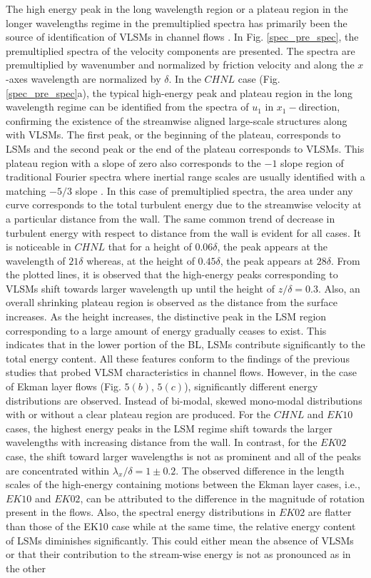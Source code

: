 The high energy peak in the  long wavelength region or a plateau region in the longer wavelengths regime in the premultiplied spectra has primarily been the source of identification of VLSMs in channel flows \cite{guala_adrian_jfm2006, fang2015blm}. In Fig. \ref{spec_pre_spec}, the premultiplied spectra of the velocity components are presented. The spectra are premultiplied by wavenumber and normalized by friction velocity and along the $x$-axes wavelength are normalized by $\delta$.  In the $CHNL$ case (Fig. \ref{spec_pre_spec}a), the typical high-energy peak and plateau region in the long wavelength regime can be identified from the spectra of $u_1$ in $x_1-$direction, confirming the existence of the streamwise aligned large-scale structures along with VLSMs. The first peak, or the beginning of the plateau, corresponds to LSMs and the second peak or the end of the plateau corresponds to VLSMs. This plateau region with a slope of zero also corresponds to the $-1$ slope region of traditional Fourier spectra where inertial range scales are usually identified with a matching $-5/3$ slope \cite{perry_chng_jfm_86,saddoughi1994}. In this case of premultiplied spectra, the area under any curve corresponds to the total turbulent energy due to the streamwise velocity at a particular distance from the wall. The same common trend of decrease in turbulent energy with respect to distance from the wall is evident for all cases. It is noticeable in $CHNL$  that for a height of $0.06\delta$, the peak appears at the wavelength of $21\delta$ whereas, at the height of $0.45\delta$, the peak appears at $28\delta$. From the plotted lines, it is observed that the high-energy peaks corresponding to VLSMs shift towards larger wavelength up until the height of $z/\delta = 0.3$. Also, an overall shrinking plateau region is observed as the distance from the surface increases. As the height increases, the distinctive peak in the LSM region corresponding to a large amount of energy gradually ceases to exist. This indicates that in the lower portion of the BL, LSMs contribute significantly to the total energy content. All these features conform to the findings of the previous studies that probed  VLSM characteristics in channel flows. However, in the case of Ekman layer flows (Fig. $5(b)$, $5(c)$), significantly  different energy distributions are observed. Instead of bi-modal, skewed mono-modal distributions with or without a clear plateau region are produced. For the $CHNL$ and $EK10$ cases, the highest energy peaks in the LSM regime shift towards the larger wavelengths with increasing distance from the wall. In contrast, for the $EK02$ case, the shift toward  larger wavelengths is not as prominent and all of the peaks are concentrated within $\lambda_x/\delta=1 \pm 0.2$. The observed difference in the length scales of the high-energy containing motions between the Ekman layer cases, i.e., $EK10$ and $EK02$, can be attributed to the difference in the magnitude of rotation present in the flows. Also, the spectral energy distributions in $EK02$  are flatter than those of the EK10 case while at the same time, the relative energy content of LSMs diminishes significantly. This could either mean the absence of VLSMs or that their contribution to the stream-wise energy is not as pronounced as in the other 